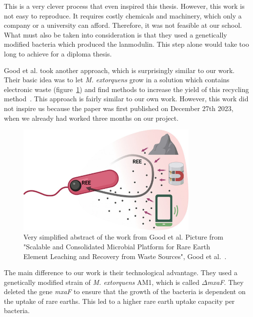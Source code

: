This is a very clever process that even inspired this thesis.
However, this work is not easy to reproduce.
It requires costly chemicals and machinery, which only a company or a university can afford.
Therefore, it was not feasible at our school.
What must also be taken into consideration is that they used a genetically modified bacteria which produced the lanmodulin.
This step alone would take too long to achieve for a diploma thesis.

\vspace{2em}

Good et al. took another approach, which is surprisingly similar to our work.
Their basic idea was to let \emph{M. extorquens} grow in a solution which contains electronic waste (figure~\ref{fig:similar_work}) and find methods to increase the yield of this recycling method~\cite{similarwork}.
This approach is fairly similar to our own work.
However, this work did not inspire us because the paper was first published on December 27th 2023, when we already had worked three months on our project.

\begin{figure}[H]
    \centering
    \includegraphics[width=0.8\textwidth]{./media/images/similar_work}
    \caption{Very simplified abstract of the work from Good et al.
    Picture from "Scalable and Consolidated Microbial Platform for Rare Earth Element Leaching and Recovery from Waste Sources", Good et al.~\cite{similarwork}.}
    \label{fig:similar_work}
\end{figure}

The main difference to our work is their technological advantage.
They used a genetically modified strain of \emph{M. extorquens} AM1, which is called \(\Delta\)\emph{mxaF}.
They deleted the gene \emph{mxaF} to ensure that the growth of the bacteria is dependent on the uptake of rare earths.
This led to a higher rare earth uptake capacity per bacteria.

